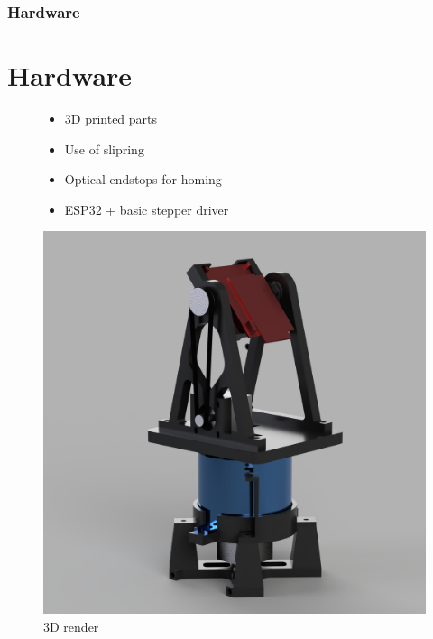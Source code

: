 \documentclass[aspectratio=43]{beamer}
\begin{document}
\begin{frame}[fragile]
  \frametitle{Hardware}
  \section{Hardware}
  \begin{figure}[!htb]
    \begin{minipage}{0.48\textwidth}
      \begin{itemize}
        \item 3D printed parts
        \item Use of slipring
        \item Optical endstops for homing
        \item ESP32 + basic stepper driver
      \end{itemize}
    \end{minipage}\hfill
    \begin{minipage}{0.48\textwidth}
      \centering
      \includegraphics[height=\linewidth]{../img/whole_assembly_2.png}
      \caption{3D render}
    \end{minipage}
  \end{figure}
\end{frame}
\end{document}
